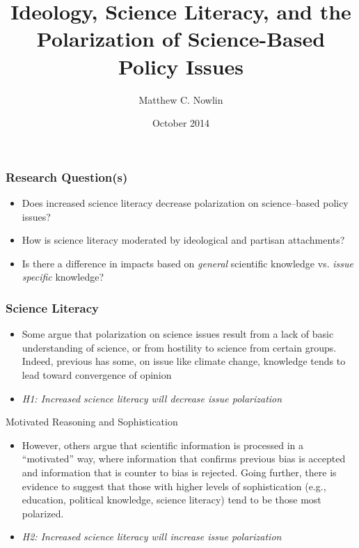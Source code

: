 \documentclass{beamer}
\title{Ideology, Science Literacy, and the Polarization of
Science-Based Policy Issues}
\author{Matthew C. Nowlin}
\institute
{Department of Political Science \\
College of Charleston \\
\url{nowlinmc@cofc.edu} \\ 
\url{https://github.com/mnowlin/ScienceLiteracy}}
\date{October 2014}
\begin{document}
\frame {\titlepage}

\begin{frame}\frametitle{Research Question(s)}

\begin{itemize}
\itemsep1pt\parskip0pt
\item
  Does increased science literacy decrease polarization on
  science--based policy issues? \vspace{0.25in}
\item
  How is science literacy moderated by ideological and partisan
  attachments? \vspace{0.25in}
\item
  Is there a difference in impacts based on \emph{general} scientific
  knowledge vs. \emph{issue specific} knowledge?
\end{itemize}

\end{frame}

\begin{frame}\frametitle{Science Literacy}

\begin{itemize}
\itemsep1pt\parskip0pt
\item
  Some argue that polarization on science issues result from a lack of
  basic understanding of science, or from hostility to science from
  certain groups. Indeed, previous has some, on issue like climate
  change, knowledge tends to lead toward convergence of opinion
  \vspace{0.25in}
\item
  \emph{H1: Increased science literacy will decrease issue polarization}
\end{itemize}

\end{frame}

\begin{frame}{Motivated Reasoning and Sophistication}

\begin{itemize}
\item 
However, others argue that scientific information is processed in a
“motivated” way, where information that confirms previous bias is
accepted and information that is counter to bias is rejected. Going
further, there is evidence to suggest that those with higher levels of
sophistication (e.g., education, political knowledge, science
literacy) tend to be those most polarized.
\vspace{0.25in}
    
\item 
 \textit{H2: Increased science literacy will increase issue
   polarization}
\end{itemize}

\end{frame}
\end{document}
